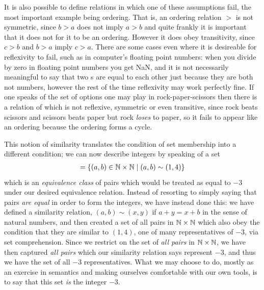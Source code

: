 \documentclass[11pt]{article}
\begin{document}
It is also possible to define relations in which one of these assumptions fail, the most important example being ordering. That is, an ordering relation $>$ is not symmetric, since $b > a$ does not imply $a > b$ and quite frankly it is important that it does not for it to be an ordering. However it does obey transitivity, since $c > b$ and $b > a$ imply $c > a$. There are some cases even where it is desireable for reflexivity to fail, such as in computer's floating point numbers: when you divide by zero in floating point numbers you get NaN, and it is not necessarily meaningful to say that two s are equal to each other just because they are both not numbers, however the rest of the time reflexivity may work perfectly fine. If one speaks of the set of options one may play in rock-paper-scissors then there is a relation of  which is not reflexive, symmetric or even transitive, since rock beats scissors and scissors beats paper but rock \emph{loses} to paper, so it fails to appear like an ordering because the ordering forms a cycle.

This notion of similarity translates the condition of set membership into a different condition; we can now describe integers by speaking of a set \begin{gather*}
[-3] = \{(a,b) \in \nats \times \nats \mid (a,b) \sim (1,4)\}
\end{gather*}
which is an \emph{equivalence class} of pairs which would be treated as equal to $-3$ under our desired equivalence relation. Instead of resorting to simply saying that pairs \emph{are equal} in order to form the integers, we have instead done this: we have defined a similarity relation, $(a,b) \sim (x,y)$ if $a + y = x + b$ in the sense of natural numbers, and then created a set of all pairs in $\mathbb{N} \times \mathbb{N}$ which also obey the condition that they are similar to $(1,4)$, one of many representatives of $-3$, via set comprehension. Since we restrict on the set of \emph{all pairs} in $\mathbb{N} \times \mathbb{N}$, we have then captured \emph{all pairs} which our similarity relation says represent $-3$, and thus we have the set of all $-3$ representatives. What we may choose to do, mostly as an exercise in semantics and making ourselves comfortable with our own tools, is to say that this set \emph{is} the integer $-3$. 
\end{document}
